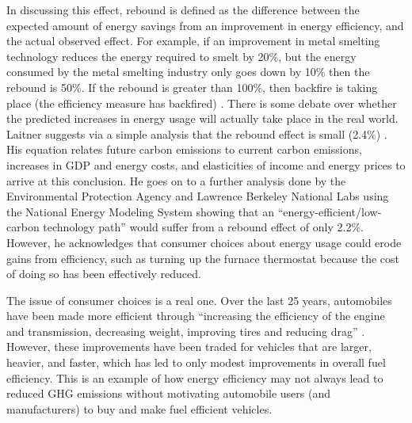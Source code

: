 In discussing this effect, rebound is defined as the difference between the expected amount of energy savings from an improvement in energy efficiency, and the actual observed effect. For example, if an improvement in metal smelting technology reduces the energy required to smelt by 20\%, but the energy consumed by the metal smelting industry only goes down by 10\% then the rebound is 50\%. If the rebound is greater than 100\%, then backfire is taking place (the efficiency measure has backfired) \cite{Hanley2008Do-increases-in}. There is some debate over whether the predicted increases in energy usage will actually take place in the real world. Laitner suggests via a simple analysis that the rebound effect is small (2.4\%) \cite{Skip-Laitner:2000yg}. His equation relates future carbon emissions to current carbon emissions, increases in GDP and energy costs, and elasticities of income and energy prices to arrive at this conclusion. He goes on to a further analysis done by the Environmental Protection Agency and Lawrence Berkeley National Labs using the National Energy Modeling System showing that an ``energy-efficient/low-carbon technology path'' would suffer from a rebound effect of only 2.2\%. However, he acknowledges that consumer choices about energy usage could erode gains from efficiency, such as turning up the furnace thermostat because the cost of doing so has been effectively reduced.

The issue of consumer choices is a real one. Over the last 25 years, automobiles have been made more efficient through ``increasing the efficiency of the engine and transmission, decreasing weight, improving tires and reducing drag'' \cite{Heywood2008Fueling-Our-Future}. However, these improvements have been traded for vehicles that are larger, heavier, and faster, which has led to only modest improvements in overall fuel efficiency. This is an example of how energy efficiency may not always lead to reduced GHG emissions without motivating automobile users (and manufacturers) to buy and make fuel efficient vehicles.

